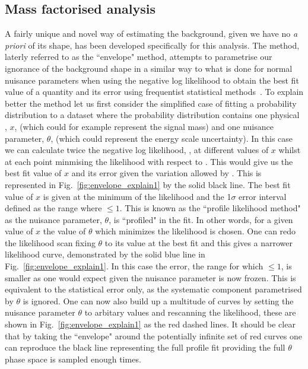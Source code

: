 \subsection{Mass factorised analysis}
\label{sec:envelope}

A fairly unique and novel way of estimating the background, given we have no \emph{a priori} of its shape, has been developed specifically for this analysis. The method, laterly referred to as the ``envelope" method, attempts to parametrise our ignorance of the background shape in a similar way to what is done for normal nuisance parameters when using the negative log likelihood to obtain the best fit value of a quantity and its error using frequentist statistical methods~\cite{FredJames}. To explain better the method let us first consider the simplified case of fitting a probability distribution to a dataset where the probability distribution contains one physical \POI, $x$, (which could for example represent the signal mass) and one nuisance parameter, $\theta$, (which could represent the energy scale uncertainty). In this case we can calculate twice the negative log likelihood, \NLL, at different values of $x$ whilst at each point minmising the likelihood with respect to \theta. 
This would give us the best fit value of $x$ and its error given the variation allowed by \theta. This is represented in Fig.~\ref{fig:envelope_explain1} by the solid black line. The best fit value of $x$ is given at the minimum of the likelihood and the 1$\sigma$ error interval defined as the range where \NLL$\leq1$. This is known as the ``profile likelihood method" as the nuisance parameter, $\theta$, is ``profiled" in the fit. In other words, for a given value of $x$ the value of $\theta$ which minimizes the likelihood is chosen. One can redo the likelihood scan fixing $\theta$ to its value at the best fit and this gives a narrower likelihood curve, demonstrated by the solid blue line in Fig.~\ref{fig:envelope_explain1}. In this case the error, the range for which \NLL$\leq1$, is smaller as one would expect given the nuisance parameter is now frozen. This is equivalent to the statistical error only, as the systematic component parametrised by $\theta$ is ignored. One can now also build up a multitude of curves by setting the nuisance parameter $\theta$ to arbitary values and rescanning the likelihood, these are shown in Fig.~\ref{fig:envelope_explain1} as the red dashed lines. It should be clear that by taking the ``envelope" around the potentially infinite set of red curves one can reproduce the black line representing the full profile fit providing the full $\theta$ phase space is sampled enough times. 
